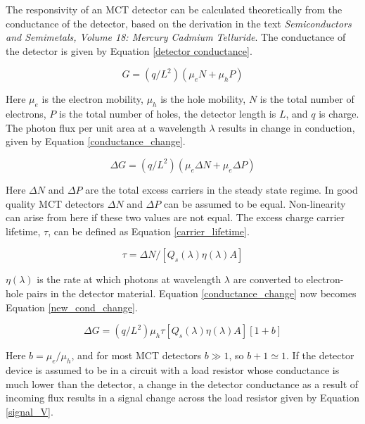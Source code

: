 The responsivity of an MCT detector can be calculated theoretically from the conductance of the detector, based on the derivation in the text \textit{Semiconductors and Semimetals, Volume 18: Mercury Cadmium Telluride}. The conductance of the detector is given by Equation \ref{detector conductance}.

\begin{equation}\label{detector conductance}
    G = (q/L^2)(\mu_eN+\mu_hP)
\end{equation}

Here $\mu_e$ is the electron mobility, $\mu_h$ is the hole mobility, $N$ is the total number of electrons, $P$ is the total number of holes, the detector length is $L$, and $q$ is charge. The photon flux per unit area at a wavelength $\lambda$ results in change in conduction, given by Equation \ref{conductance_change}.

\begin{equation}\label{conductance_change}
    \Delta G = (q/L^2)(\mu_e \Delta N + \mu_e \Delta P)
\end{equation}

Here $\Delta N$ and $\Delta P$ are the total excess carriers in the steady state regime. In good quality MCT detectors $\Delta N$ and $\Delta P$ can be assumed to be equal. Non-linearity can arise from here if these two values are not equal. The excess charge carrier lifetime, $\tau$, can be defined as Equation \ref{carrier_lifetime}.

\begin{equation}\label{carrier_lifetime}
    \tau = \Delta N / [Q_s(\lambda)\eta(\lambda)A]
\end{equation}

$\eta(\lambda)$ is the rate at which photons at wavelength $\lambda$ are converted to electron-hole pairs in the detector material. Equation \ref{conductance_change} now becomes Equation \ref{new_cond_change}.

\begin{equation}\label{new_cond_change}
    \Delta G = (q/L^2)\mu_h \tau[Q_s(\lambda)\eta(\lambda)A][1+b]
\end{equation}

Here $b = \mu_e/\mu_h$, and for most MCT detectors $b \gg 1$, so $b +1 \simeq 1$. If the detector device is assumed to be in a circuit with a load resistor whose conductance is much lower than the detector, a change in the detector conductance as a result of incoming flux results in a signal change across the load resistor given by Equation \ref{signal_V}.

